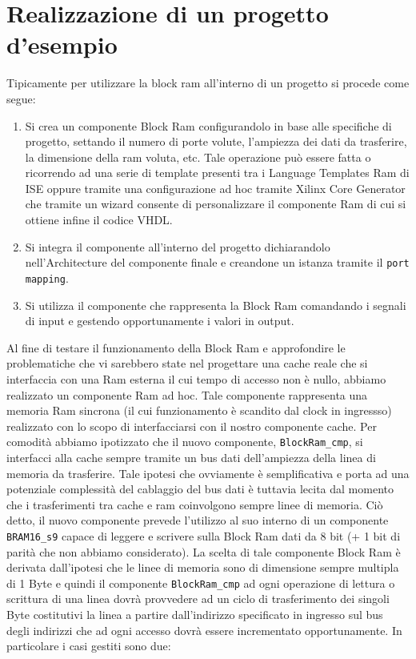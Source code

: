 \section{Realizzazione di un progetto d'esempio}

Tipicamente per utilizzare la block ram all'interno di un progetto si procede come segue:\\
\begin{enumerate}
\item Si crea un componente Block Ram configurandolo in base alle specifiche di progetto, settando il numero di porte volute, l'ampiezza dei dati da trasferire, la dimensione della ram voluta, etc. Tale operazione pu\`o essere fatta o ricorrendo ad una serie di template presenti tra i Language Templates Ram di ISE oppure tramite una configurazione ad hoc tramite Xilinx Core Generator che tramite un wizard consente di personalizzare il componente Ram di cui si ottiene infine il codice VHDL.
\item Si integra il componente all'interno del progetto dichiarandolo nell'Architecture del componente finale e creandone un istanza tramite il \texttt{port mapping}.
\item Si utilizza il componente che rappresenta la Block Ram comandando i segnali di input e gestendo opportunamente i valori in output.
\end{enumerate}

Al fine di testare il funzionamento della Block Ram e approfondire le problematiche che vi sarebbero state nel progettare una cache reale che si interfaccia con una Ram esterna il cui tempo di accesso non \`e nullo, abbiamo realizzato un componente Ram ad hoc. Tale componente rappresenta una memoria Ram sincrona (il cui funzionamento \`e scandito dal clock in ingressso) realizzato con lo scopo di interfacciarsi con il nostro componente cache. Per comodit\`a abbiamo ipotizzato che il nuovo componente, \texttt{BlockRam\_cmp}, si interfacci alla cache sempre tramite un bus dati dell'ampiezza della linea di memoria da trasferire. Tale ipotesi che ovviamente \`e semplificativa e porta ad una potenziale complessit\`a del cablaggio del bus dati \`e tuttavia lecita dal momento che i trasferimenti tra cache e ram coinvolgono sempre linee di memoria. Ci\`o detto, il nuovo componente prevede l'utilizzo al suo interno di un componente \texttt{BRAM16\_s9} capace di leggere e scrivere sulla Block Ram dati da 8 bit (+ 1 bit di parit\`a che non abbiamo considerato). La scelta di tale componente Block Ram è derivata dall'ipotesi che le linee di memoria sono di dimensione sempre multipla di 1 Byte e quindi il componente \texttt{BlockRam\_cmp} ad ogni operazione di lettura o scrittura di una linea dovrà provvedere ad un ciclo di trasferimento dei singoli Byte costitutivi la linea a partire dall'indirizzo specificato in ingresso sul bus degli indirizzi che ad ogni accesso dovr\`a essere incrementato opportunamente. In particolare i casi gestiti sono due:\\

